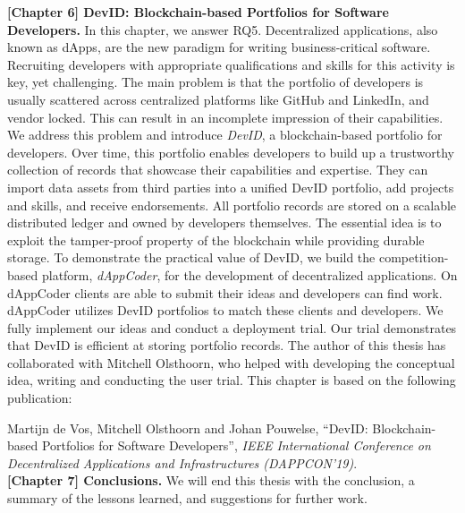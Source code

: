 \textbf{[Chapter 6] DevID: Blockchain-based Portfolios for Software Developers.}
In this chapter, we answer RQ5.
Decentralized applications, also known as dApps, are the new paradigm for writing business-critical software.
Recruiting developers with appropriate qualifications and skills for this activity is key, yet challenging.
The main problem is that the portfolio of developers is usually scattered across centralized platforms like GitHub and LinkedIn, and vendor locked.
This can result in an incomplete impression of their capabilities.
We address this problem and introduce \emph{DevID}, a blockchain-based portfolio for developers.
Over time, this portfolio enables developers to build up a trustworthy collection of records that showcase their capabilities and expertise.
They can import data assets from third parties into a unified DevID portfolio, add projects and skills, and receive endorsements.
All portfolio records are stored on a scalable distributed ledger and owned by developers themselves.
The essential idea is to exploit the tamper-proof property of the blockchain while providing durable storage.
To demonstrate the practical value of DevID, we build the competition-based platform, \emph{dAppCoder}, for the development of decentralized applications.
On dAppCoder clients are able to submit their ideas and developers can find work.
dAppCoder utilizes DevID portfolios to match these clients and developers.
We fully implement our ideas and conduct a deployment trial.
Our trial demonstrates that DevID is efficient at storing portfolio records.
The author of this thesis has collaborated with Mitchell Olsthoorn, who helped with developing the conceptual idea, writing and conducting the user trial.
This chapter is based on the following publication:

Martijn de Vos, Mitchell Olsthoorn and Johan Pouwelse, \enquote{DevID: Blockchain-based Portfolios for Software Developers}, \emph{IEEE International Conference on Decentralized Applications and Infrastructures (DAPPCON'19)}.\\

\textbf{[Chapter 7] Conclusions.} We will end this thesis with the conclusion, a summary of the lessons learned, and suggestions for further work.


